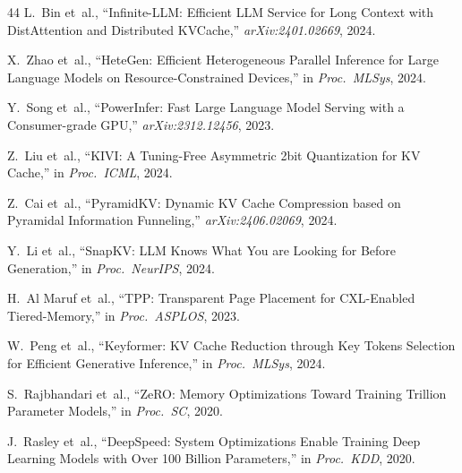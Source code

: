 \documentclass[conference]{IEEEtran}
\begin{document}
\begin{thebibliography}{44}
 L.~Bin et~al., ``Infinite-LLM: Efficient LLM Service for Long Context with DistAttention and Distributed KVCache,'' \textit{arXiv:2401.02669}, 2024.

 X.~Zhao et~al., ``HeteGen: Efficient Heterogeneous Parallel Inference for Large Language Models on Resource-Constrained Devices,'' in \textit{Proc.\ MLSys}, 2024.

 Y.~Song et~al., ``PowerInfer: Fast Large Language Model Serving with a Consumer-grade GPU,'' \textit{arXiv:2312.12456}, 2023.

 Z.~Liu et~al., ``KIVI: A Tuning-Free Asymmetric 2bit Quantization for KV Cache,'' in \textit{Proc.\ ICML}, 2024.

 Z.~Cai et~al., ``PyramidKV: Dynamic KV Cache Compression based on Pyramidal Information Funneling,'' \textit{arXiv:2406.02069}, 2024.

 Y.~Li et~al., ``SnapKV: LLM Knows What You are Looking for Before Generation,'' in \textit{Proc.\ NeurIPS}, 2024.

 H.~Al Maruf et~al., ``TPP: Transparent Page Placement for CXL-Enabled Tiered-Memory,'' in \textit{Proc.\ ASPLOS}, 2023.

 W.~Peng et~al., ``Keyformer: KV Cache Reduction through Key Tokens Selection for Efficient Generative Inference,'' in \textit{Proc.\ MLSys}, 2024.

 S.~Rajbhandari et~al., ``ZeRO: Memory Optimizations Toward Training Trillion Parameter Models,'' in \textit{Proc.\ SC}, 2020.

 J.~Rasley et~al., ``DeepSpeed: System Optimizations Enable Training Deep Learning Models with Over 100 Billion Parameters,'' in \textit{Proc.\ KDD}, 2020.

\end{thebibliography}
\end{document}
